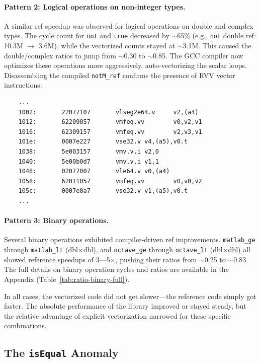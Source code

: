 \paragraph{Pattern 2: Logical operations on non-integer types.} A similar ref speedup was observed for logical operations on double and complex types. The cycle count for \texttt{not} and \texttt{true} decreased by $\sim$65\% (e.g., \texttt{not} double ref: 10.3M $\rightarrow$ 3.6M), while the vectorized counts stayed at $\sim$3.1M. This caused the double/complex ratios to jump from $\sim$0.30 to $\sim$0.85. The GCC compiler now optimizes these operations more aggressively, auto-vectorizing the scalar loops. Disassembling the compiled \texttt{notM\_ref} confirms the presence of RVV vector instructions:

\begin{verbatim}
    ...
    1002:       22077107       vlseg2e64.v     v2,(a4)
    1012:       62209057       vmfeq.vv        v0,v2,v1
    1016:       62309157       vmfeq.vv        v2,v3,v1
    101e:       0007e227       vse32.v v4,(a5),v0.t
    1038:       5e003157       vmv.v.i v2,0
    1040:       5e00b0d7       vmv.v.i v1,1
    1048:       02077007       vle64.v v0,(a4)
    1058:       62011057       vmfeq.vv        v0,v0,v2
    105c:       0007e0a7       vse32.v v1,(a5),v0.t
    ...
\end{verbatim}

\paragraph{Pattern 3: Binary operations.} Several binary operations exhibited compiler-driven ref improvements. \texttt{matlab\_ge} through \texttt{matlab\_lt} (dbl$\times$dbl), and \texttt{octave\_ge} through \texttt{octave\_lt} (dbl$\times$dbl) all showed reference speedups of 3---5$\times$, pushing their ratios from $\sim$0.25 to $\sim$0.83. The full details on binary operation cycles and ratios are available in the Appendix (Table~\ref{tab:ratio-binary-full}).

In all cases, the vectorized code did not get slower---the reference code simply got faster. The absolute performance of the library improved or stayed steady, but the relative advantage of explicit vectorization narrowed for these specific combinations.

\subsection{The \texttt{isEqual} Anomaly}

